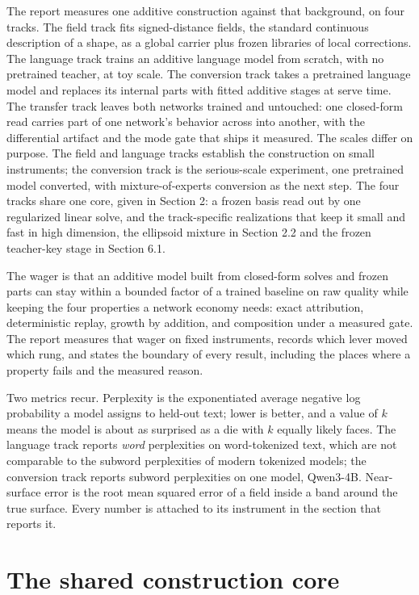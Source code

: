 \documentclass[11pt]{article}
\begin{document}
The report measures one additive construction against that
background, on four tracks. The field track fits signed-distance
fields, the standard continuous description of a shape, as a global
carrier plus frozen libraries of local corrections. The language
track trains an additive language model from scratch, with no
pretrained teacher, at toy scale. The conversion track takes a
pretrained language model and replaces its internal parts with
fitted additive stages at serve time. The transfer track leaves
both networks trained and untouched: one closed-form read carries
part of one network's behavior across into another, with the
differential artifact and the mode gate that ships it measured.
The scales differ on
purpose. The field and language tracks establish the construction
on small instruments; the conversion track is the serious-scale
experiment, one pretrained model converted, with mixture-of-experts
conversion as the next step. The four tracks share one core,
given in Section 2: a frozen basis read out by one regularized
linear solve, and the track-specific realizations that keep it
small and fast in high dimension, the ellipsoid mixture in
Section 2.2 and the frozen teacher-key stage in Section 6.1.

The wager is that an additive model built from closed-form solves
and frozen parts can stay within a bounded factor of a trained
baseline on raw quality while keeping the four properties a network
economy needs: exact attribution, deterministic replay, growth by
addition, and composition under a measured gate. The report
measures that wager on fixed instruments, records which lever moved
which rung, and states the boundary of every result, including the
places where a property fails and the measured reason.

Two metrics recur. Perplexity is the exponentiated average negative
log probability a model assigns to held-out text; lower is better,
and a value of $k$ means the model is about as surprised as a die
with $k$ equally likely faces. The language track reports
\emph{word} perplexities on word-tokenized text, which are not
comparable to the subword perplexities of modern tokenized models;
the conversion track reports subword perplexities on one model,
Qwen3-4B. Near-surface error is the root mean squared error of a
field inside a band around the true surface. Every number is
attached to its instrument in the section that reports it.

\section{The shared construction core}
\end{document}
